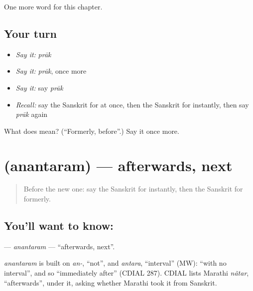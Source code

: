 \begin{grammarlens}[title={What you've built}]
One more word for this chapter.
\end{grammarlens}

\subsection*{Your turn}
\begin{itemize}
\raggedright
  \item \emph{Say it:} \emph{prāk}
  \item \emph{Say it:} \emph{prāk}, once more
  \item \emph{Say it:} say \emph{prāk}
  \item \emph{Recall:} say the Sanskrit for at once, then the Sanskrit for instantly, then say \emph{prāk} again
\end{itemize}

\begin{tcolorbox}[breakable,colback=teal!4,colframe=teal!35!black,title={Before you move on}]
What does  mean? (\textquotedblleft{}Formerly, before\textquotedblright{}.) Say it once more.
\end{tcolorbox}
\section[\texorpdfstring{\sk{अनन्तरम्} (anantaram)}{अनन्तरम् (anantaram)}]{ (anantaram) — afterwards, next}

\label{lesson:SA-C213-anantaram}



\begin{quote}
Before the new one: say the Sanskrit for instantly, then the Sanskrit for formerly.
\end{quote}

\subsection*{You'll want to know: }
\textbf{} — \emph{anantaram} — \textquotedblleft{}afterwards, next\textquotedblright{}.

\begin{cousinweb}
\emph{anantaram} is built on \emph{an-}, \textquotedblleft{}not\textquotedblright{}, and \emph{antara}, \textquotedblleft{}interval\textquotedblright{} (MW): \textquotedblleft{}with no interval\textquotedblright{}, and so \textquotedblleft{}immediately after\textquotedblright{} (CDIAL 287). CDIAL lists Marathi \emph{nãtar}, \textquotedblleft{}afterwards\textquotedblright{}, under it, asking whether Marathi took it from Sanskrit.
\end{cousinweb}

